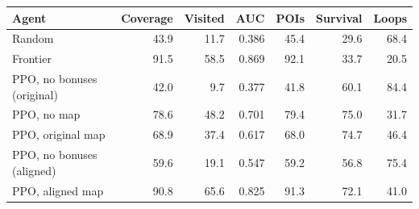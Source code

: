\begin{tabular}{@{}lrrrrrr@{}}\toprule
Agent & Coverage & Visited & AUC & POIs & Survival & Loops\\\midrule
Random & 43.9 & 11.7 & 0.386 & 45.4 & 29.6 & 68.4\\
Frontier & 91.5 & 58.5 & 0.869 & 92.1 & 33.7 & 20.5\\
PPO, no bonuses (original) & 42.0 & 9.7 & 0.377 & 41.8 & 60.1 & 84.4\\
PPO, no map & 78.6 & 48.2 & 0.701 & 79.4 & 75.0 & 31.7\\
PPO, original map & 68.9 & 37.4 & 0.617 & 68.0 & 74.7 & 46.4\\
PPO, no bonuses (aligned) & 59.6 & 19.1 & 0.547 & 59.2 & 56.8 & 75.4\\
\rowcolor{accent!8}PPO, aligned map & 90.8 & 65.6 & 0.825 & 91.3 & 72.1 & 41.0\\
\bottomrule\end{tabular}
